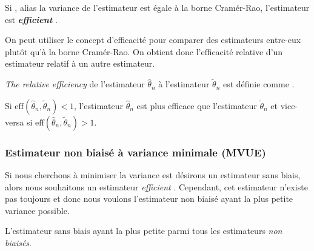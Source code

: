 \documentclass[10pt, french]{article}
\begin{document}
\begin{multicols*}{2}
\begin{definitionNOHFILL}
\begin{definitionNOHFILLsub}
Si , alias la variance de l'estimateur est égale à la borne Cramér-Rao, l'estimateur est \textbf{\og \textit{efficient} \fg{}}.
\end{definitionNOHFILLsub}
\end{definitionNOHFILL}


\begin{rappel_enhanced}[Motivation]
On peut utiliser le concept d'efficacité pour comparer des estimateurs entre-eux plutôt qu'à la borne Cramér-Rao. On obtient donc l'efficacité relative d'un estimateur relatif à un autre estimateur.
\end{rappel_enhanced}

\begin{definitionNOHFILL}
\og \textit{The relative efficiency} \fg{} de l'estimateur $\hat\theta_{n}$ à l'estimateur $\tilde\theta_{n}$ est définie comme .

\bigskip

Si $\text{eff}(\hat\theta_{n}, \tilde\theta_{n}) < 1$, l'estimateur $\hat{\theta}_{n}$ est plus efficace que l'estimateur $\tilde{\theta}_{n}$ et vice-versa si $\text{eff}(\hat\theta_{n}, \tilde\theta_{n}) > 1$.
\end{definitionNOHFILL}



\columnbreak
\subsubsection{Estimateur non biaisé à variance minimale (MVUE)} \label{subsubsec:MVUECriteria}
\begin{rappel_enhanced}[Motivation]
Si nous cherchons à minimiser la variance est désirons un estimateur sans biais, alors nous souhaitons un estimateur \og \textit{efficient} \fg{}. Cependant, cet estimateur n'existe pas toujours et donc nous voulons l'estimateur non biaisé ayant la plus petite variance possible.
\end{rappel_enhanced}

\begin{definitionNOHFILL}
L'estimateur sans biais ayant la plus petite parmi tous les estimateurs \textit{non biaisés}.


\end{definitionNOHFILL}
\end{multicols*}
\end{document}
